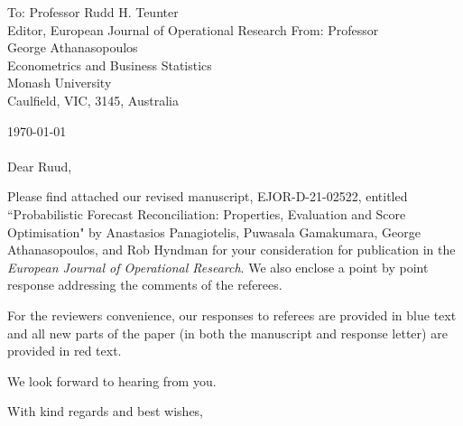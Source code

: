 \documentclass[11pt,a4paper]{letter}
\date{}
\begin{document}
 \begin{letter}{To: Professor Rudd H. Teunter\\
    Editor, European Journal of Operational Research}
    From: Professor\\
    George Athanasopoulos\\
    Econometrics and Business Statistics\\
    Monash University\\
    Caulfield, VIC, 3145, Australia

 \opening{\today\ \\\\Dear Ruud,}
 \medskip

Please find attached our revised manuscript, EJOR-D-21-02522, entitled ``Probabilistic Forecast Reconciliation: Properties, Evaluation and Score Optimisation" by Anastasios Panagiotelis, Puwasala Gamakumara, George Athanasopoulos, and Rob Hyndman for your consideration for publication in the \textit{European Journal of Operational Research}. We also enclose a point by point response addressing the comments of the referees. 

For the reviewers convenience, our responses to referees are provided in {\color{blue} blue} text and all new parts of the paper (in both the manuscript and response letter) are provided in {\color{red} red} text. 

We look forward to hearing from you.

 \closing{With kind regards and best wishes,}

 \end{letter}
\end{document}
